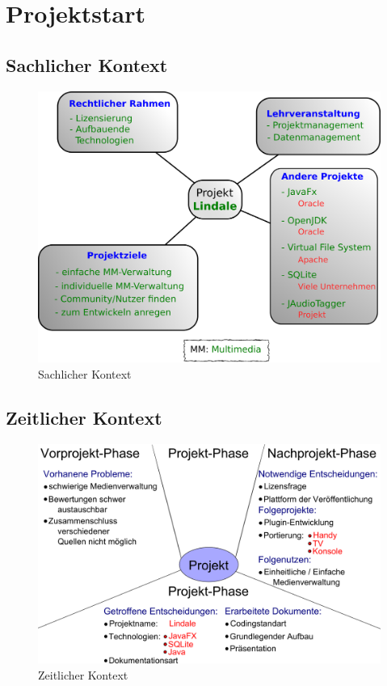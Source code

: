 \chapter{Projektstart}
\section{Sachlicher Kontext}
\begin{figure}[!ht]
\includegraphics[width=\linewidth]{images/sachlicher-kontext}
\caption{Sachlicher Kontext}
\end{figure}
\newpage
\section{Zeitlicher Kontext}
\begin{figure}[!ht]
\includegraphics[width=\linewidth]{images/zeitlicher-kontext}
\caption{Zeitlicher Kontext}
\end{figure}
\newpage
